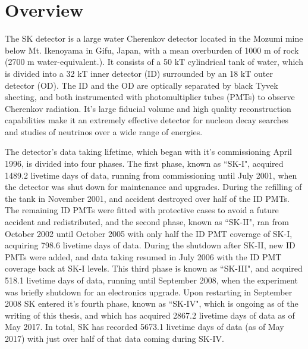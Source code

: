 \section{Overview}
\label{sec:sk_detector_overview}
The SK detector is a large water Cherenkov detector located in the Mozumi mine below Mt. Ikenoyama in Gifu, Japan, with a mean overburden of 1000 m of rock (2700 m water-equivalent.).  It consists of a 50 kT cylindrical tank of water, which is divided into a 32 kT inner detector (ID) surrounded by an 18 kT outer detector (OD).  The ID and the OD are optically separated by black Tyvek sheeting, and both instrumented with photomultiplier tubes (PMTs) to observe Cherenkov radiation. It's large fiducial volume and high quality reconstruction capabilities make it an extremely effective detector for nucleon decay searches and studies of neutrinos over a wide range of energies. \par
The detector's data taking lifetime, which began with it's commissioning  April 1996, is divided into four phases.  The first phase, known as ``SK-I", acquired 1489.2 livetime days of data, running from commissioning until July 2001, when the detector was shut down for maintenance and upgrades.  During the refilling of the tank in November 2001, and accident destroyed over half of the ID PMTs.  The remaining ID PMTs were fitted with protective cases to avoid a future accident and redistributed, and the second phase, known as ``SK-II", ran from October 2002 until October 2005 with only half the ID PMT coverage of SK-I, acquiring 798.6 livetime days of data.  During the shutdown after SK-II, new ID PMTs were added, and data taking resumed in July 2006 with the ID PMT coverage back at SK-I levels.  This third phase is known as ``SK-III", and acquired 518.1 livetime days of data, running until September 2008, when the experiment was briefly shutdown for an electronics upgrade.  Upon restarting in September 2008 SK entered it's fourth phase, known as ``SK-IV", which is ongoing as of the writing of this thesis, and which has acquired 2867.2 livetime days of data as of May 2017.  In total, SK has recorded 5673.1 livetime days of data (as of May 2017) with just over half of that data coming during SK-IV.      